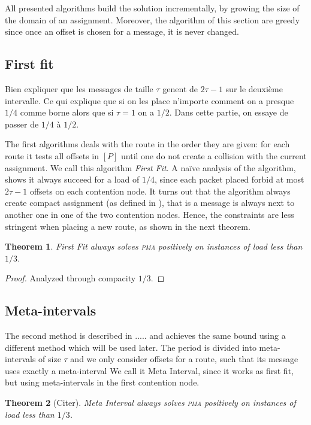 \documentclass[10pt, conference, letterpaper]{IEEEtran}
\newtheorem{theorem}{Theorem}
\newcommand\pma{\textsc{pma}\xspace}
\begin{document}
All presented algorithms build the solution incrementally, by growing the size of the domain
of an assignment. Moreover, the algorithm of this section are greedy since once 
an offset is chosen for a message, it is never changed.

\subsection{First fit}

Bien expliquer que les messages de taille $\tau$
genent de $2\tau -1$ sur le deuxième intervalle. 
Ce qui explique que si on les place n'importe comment on a presque
$1/4$ comme borne alors que si $\tau = 1$ on a $1/2$. Dans cette partie,
on essaye de passer de $1/4$ à $1/2$.


The first algorithms deals with the route in the order they are given:  for each route it 
tests all offsets in $[P]$ until one do not create a collision with the current assignment.
We call this algorithm \emph{First Fit}. A naïve analysis of the algorithm, 
shows it always succeed for a load of $1/4$, since each packet placed forbid at most
$2\tau -1$ offsets on each contention node. It turns out that the algorithm always
create compact assignment (as defined in \cite{barth2018deterministic}), that is a message is always next to another one in one of the two contention nodes. Hence, the constraints are less stringent when placing a new route, as shown in the next theorem.

\begin{theorem}
First Fit always solves \pma positively on instances of load less than
$1/3$. 
\end{theorem}
\begin{proof}
Analyzed through compacity $1/3$.
\end{proof}

\subsection{Meta-intervals}

The second method is described  in ..... and achieves the same bound using a different 
method which will be used later.
The period is divided into meta-intervals of size $\tau$ and we only consider offsets
for a route, such that its message uses exactly a meta-interval
We call it Meta Interval, since it works as first fit, but using meta-intervals
in the first contention node.
\begin{theorem}[Citer]
Meta Interval always solves \pma positively on instances of load less than
$1/3$.
\end{theorem}
\end{document}
